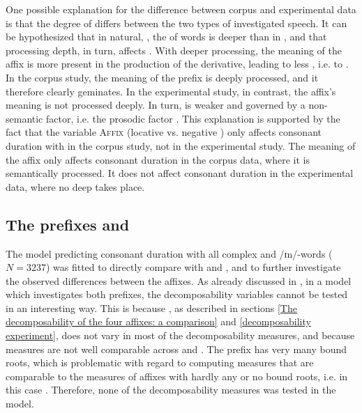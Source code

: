 One possible explanation for the difference between corpus and experimental data is that the degree of  differs between the two types of investigated speech. It can be hypothesized that in natural, ,  the  of words is deeper than in , and that processing depth, in turn, affects . With deeper processing, the meaning of the affix is more present in the production of the derivative, leading to less , i.e. to . 
 In the corpus study, the meaning of the prefix is deeply processed, and it therefore clearly geminates. In the experimental study, in contrast, the affix's meaning is not processed deeply. In turn,  is weaker and governed by a non-semantic factor,  i.e. the prosodic factor .
  This explanation is supported by the fact that the variable \textsc{Affix} (locative  vs. negative ) only affects consonant duration with  in the corpus study, not in the experimental study. The meaning of the affix only affects consonant duration in the corpus data, where it is semantically processed. It does not affect consonant duration in the experimental data, where no deep  takes place.





\subsection{The prefixes  and }
The model predicting consonant duration with all complex  and /ɪn/-words ($N=3237$) was fitted to directly compare  with  and , and to further investigate the observed differences between the affixes.
As already discussed in , in a model which investigates both prefixes, the decomposability variables cannot be tested in an interesting way. This is because , as described in sections \ref{The decomposability of the four affixes: a comparison} and \ref{decomposability experiment}, does not vary in most of the decomposability measures, and because  measures are not well comparable across  and . The prefix  has very many bound roots, which is problematic with regard to computing  measures that are comparable to the  measures of affixes with hardly any or no bound roots, i.e. in this case . Therefore, none of the decomposability measures was tested in the model. 

